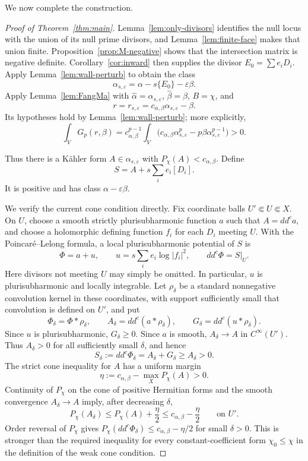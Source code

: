 \documentclass[reqno]{amsart}
\newcommand{\ddc}{dd^c}
\newcommand{\cab}{c_{\alpha,\beta}}
\theoremstyle{plain}
\theoremstyle{remark}
\begin{document}
We now complete the construction.
\begin{proof}[Proof of Theorem~\ref{thm:main}]
Lemma~\ref{lem:only-divisors} identifies the null locus with the union
of its null prime divisors, and Lemma~\ref{lem:finite-face} makes that
union finite. Proposition~\ref{prop:M-negative} shows that the
intersection matrix is negative
definite.  Corollary~\ref{cor:inward} then supplies the divisor
$E_0=\sum e_iD_i$.
Apply Lemma~\ref{lem:wall-perturb} to obtain the class
\[
 \alpha_{s,\varepsilon}
 =\alpha-s\{E_0\}-\varepsilon\beta.
\]
Apply Lemma~\ref{lem:FangMa} with
$\widehat\alpha=\alpha_{s,\varepsilon}$,
$\widehat\beta=\beta$, $B=\chi$, and
\[
 r=r_{s,\varepsilon}
 =\cab\alpha_{s,\varepsilon}-\beta.
\]
Its hypotheses hold by
Lemma~\ref{lem:wall-perturb}; more explicitly,
\[
\int_V G_p(r,\beta)
=\cab^{p-1}\int_V
 \bigl(\cab\alpha_{s,\varepsilon}^{p}
       -p\beta\alpha_{s,\varepsilon}^{p-1}\bigr)>0.
\]

Thus there is a K\"ahler form
$A\in\alpha_{s,\varepsilon}$ with $P_\chi(A)<\cab$.
Define
\[
 S=A+s\sum_i e_i[D_i].
\]
It is positive and has class $\alpha-\varepsilon\beta$.

We verify the current cone condition directly. Fix coordinate balls
$U'\Subset U\Subset X$.  On $U$, choose a smooth strictly
plurisubharmonic function $a$ such that $A=\ddc a$, and choose a
holomorphic defining function $f_i$ for each $D_i$ meeting $U$.
With the Poincar\'e--Lelong formula, a local
plurisubharmonic potential of $S$ is
\[
 \Phi=a+u,\qquad
 u=s\sum_i e_i\log|f_i|^2,\qquad
 \ddc\Phi=S|_U.
\]
Here divisors not meeting $U$ may simply be omitted.  In particular,
$u$ is plurisubharmonic and locally integrable.
Let $\rho_\delta$ be a standard nonnegative convolution kernel in
these coordinates, with support sufficiently small that convolution is
defined on $U'$, and put
\[
 \Phi_\delta=\Phi*\rho_\delta,\qquad
 A_\delta=\ddc(a*\rho_\delta),\qquad
 G_\delta=\ddc(u*\rho_\delta).
\]
Since $u$ is plurisubharmonic, $G_\delta\geq0$.  Since $a$ is
smooth, $A_\delta\to A$ in $C^\infty(U')$. Thus $A_\delta>0$
for all sufficiently small $\delta$, and hence
\[
 S_\delta:=\ddc\Phi_\delta=A_\delta+G_\delta\geq A_\delta>0.
\]
The strict cone inequality for $A$ has a uniform margin
\[
 \eta:=\cab-\max_X P_\chi(A)>0.
\]
Continuity of $P_\chi$ on the cone of positive Hermitian forms and
the smooth convergence $A_\delta\to A$ imply, after decreasing
$\delta$,
\[
 P_\chi(A_\delta)\leq P_\chi(A)+\frac\eta2
 \leq\cab-\frac\eta2
 \qquad\text{on }U'.
\]
Order reversal of $P_\chi$ gives
$P_\chi(\ddc\Phi_\delta)\leq\cab-\eta/2$ for small $\delta>0$.
This is stronger than the required inequality for every
constant-coefficient form $\chi_0\leq\chi$ in the definition of the
weak cone condition.


\end{proof}
\end{document}
